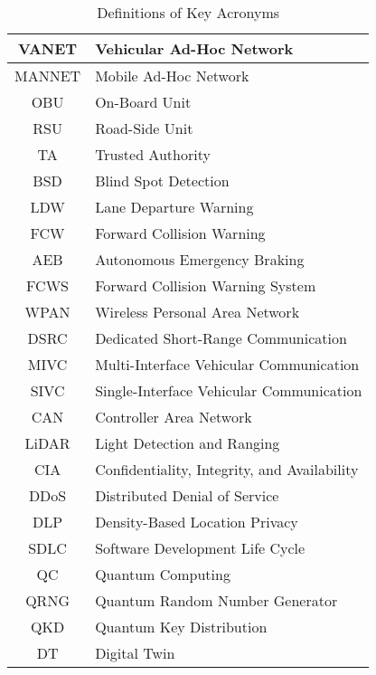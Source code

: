 \begin{table}[ht]
\begin{tabular}{|c|l|}
        VANET & Vehicular Ad-Hoc Network \\ \hline
        MANNET & Mobile Ad-Hoc Network \\ \hline
        OBU & On-Board Unit \\ \hline
        RSU & Road-Side Unit \\ \hline
        TA & Trusted Authority \\ \hline
        BSD & Blind Spot Detection \\ \hline
        LDW & Lane Departure Warning \\ \hline
        FCW & Forward Collision Warning \\ \hline
        AEB & Autonomous Emergency Braking \\ \hline
        FCWS & Forward Collision Warning System \\ \hline
        WPAN & Wireless Personal Area Network \\ \hline
        DSRC & Dedicated Short-Range Communication \\ \hline
        MIVC & Multi-Interface Vehicular Communication \\ \hline
        SIVC & Single-Interface Vehicular Communication \\ \hline
        CAN & Controller Area Network \\ \hline
        LiDAR & Light Detection and Ranging \\ \hline
        CIA & Confidentiality, Integrity, and Availability \\ \hline
        DDoS & Distributed Denial of Service \\ \hline
        DLP & Density-Based Location Privacy \\ \hline
        SDLC & Software Development Life Cycle \\ \hline
        QC & Quantum Computing \\ \hline
        QRNG & Quantum Random Number Generator \\ \hline
        QKD & Quantum Key Distribution \\ \hline
        DT & Digital Twin \\ \hline
    \end{tabular}
    \caption{Definitions of Key Acronyms}
    \label{tab:acronyms-full}
\end{table}